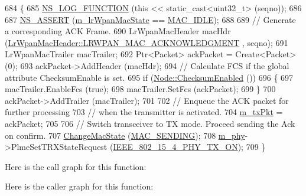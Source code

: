 \begin{DoxyCode}
684 \{
685   \hyperlink{log-macros-disabled_8h_a90b90d5bad1f39cb1b64923ea94c0761}{NS\_LOG\_FUNCTION} (\textcolor{keyword}{this} << static\_cast<uint32\_t> (seqno));
686 
687   \hyperlink{assert_8h_a6dccdb0de9b252f60088ce281c49d052}{NS\_ASSERT} (\hyperlink{classns3_1_1LrWpanMac_ab5cdfd39de7397d658d300961dab3ed0}{m\_lrWpanMacState} == \hyperlink{group__lr-wpan_gga02ee7efd682937a8781f5e6101f61884a091c013ccdbce1011c1a4e141b227730}{MAC\_IDLE});
688 
689   \textcolor{comment}{// Generate a corresponding ACK Frame.}
690   LrWpanMacHeader macHdr (\hyperlink{classns3_1_1LrWpanMacHeader_a09363d4738e8ab00b82db8268b65d7a0ab381567bcc62e95ac35db223bf770f58}{LrWpanMacHeader::LRWPAN\_MAC\_ACKNOWLEDGMENT}
      , seqno);
691   LrWpanMacTrailer macTrailer;
692   Ptr<Packet> ackPacket = Create<Packet> (0);
693   ackPacket->AddHeader (macHdr);
694   \textcolor{comment}{// Calculate FCS if the global attribute ChecksumEnable is set.}
695   \textcolor{keywordflow}{if} (\hyperlink{classns3_1_1Node_a0515bfe9a3aeb6605d657ba855699815}{Node::ChecksumEnabled} ())
696     \{
697       macTrailer.EnableFcs (\textcolor{keyword}{true});
698       macTrailer.SetFcs (ackPacket);
699     \}
700   ackPacket->AddTrailer (macTrailer);
701 
702   \textcolor{comment}{// Enqueue the ACK packet for further processing}
703   \textcolor{comment}{// when the transmitter is activated.}
704   \hyperlink{classns3_1_1LrWpanMac_aca93e7c7a2128818f2861a48751442ca}{m\_txPkt} = ackPacket;
705 
706   \textcolor{comment}{// Switch transceiver to TX mode. Proceed sending the Ack on confirm.}
707   \hyperlink{classns3_1_1LrWpanMac_a9218b72b6b4326ae606de4a74a82ab6d}{ChangeMacState} (\hyperlink{group__lr-wpan_gga02ee7efd682937a8781f5e6101f61884acf17acc290679d9afce9a216fcf742bc}{MAC\_SENDING});
708   \hyperlink{classns3_1_1LrWpanMac_ae3184afcbda99342d45c0b7e6cf9f33a}{m\_phy}->PlmeSetTRXStateRequest (\hyperlink{group__lr-wpan_gga6494269d13d45c511a07b7ccbb1de754aa595d552b56b89b363b800b9fcfbe67f}{IEEE\_802\_15\_4\_PHY\_TX\_ON});
709 \}
\end{DoxyCode}


Here is the call graph for this function\+:




Here is the caller graph for this function\+:


